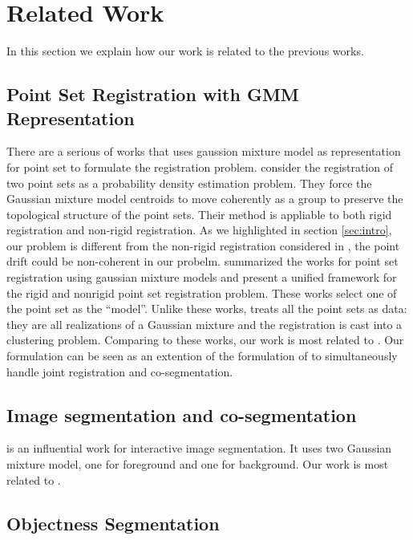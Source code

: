 \section{Related Work}
\label{sec:rw}
In this section we explain how our work is related to the previous works.
\subsection{Point Set Registration with GMM Representation}
\label{subsec:gmmreg}
There are a serious of works that uses gaussion mixture model as representation for point set to formulate the registration problem.
\cite{CPD} consider the registration of two point sets as a probability density estimation problem. They force the Gaussian mixture model centroids to move coherently as a group to preserve the topological structure of the point sets. Their method is appliable to both rigid registration and non-rigid registration. As we highlighted in section \ref{sec:intro}, our problem is different from the non-rigid registration considered in \cite{CPD}, the point drift could be non-coherent in our probelm.\cite{GMM_PAMI} summarized the works for point set registration using gaussian mixture models and present a unified framework for the rigid and nonrigid point set registration problem. These works select one of the point set as the ``model''. Unlike these works, \cite{Evangelidis2014} treats all the point sets as data: they are all realizations of a Gaussian mixture and the registration is cast into a clustering problem. Comparing to these works, our work is most related to \cite{Evangelidis2014}. Our formulation can be seen as an extention of the formulation of \cite{Evangelidis2014} to simultaneously handle joint registration and co-segmentation.
\subsection{Image segmentation and co-segmentation}
\label{subsec:coseg}
\cite{grabcut} is an influential work for interactive image segmentation. It uses two Gaussian mixture model, one for foreground and one for background. 
Our work is most related to \cite{Taniai_2016_CVPR}.

\subsection{Objectness Segmentation}
\label{subsec:objectness}
\cite{3DReasoningfromBlockstoStability}
\cite{pixelobjectness}